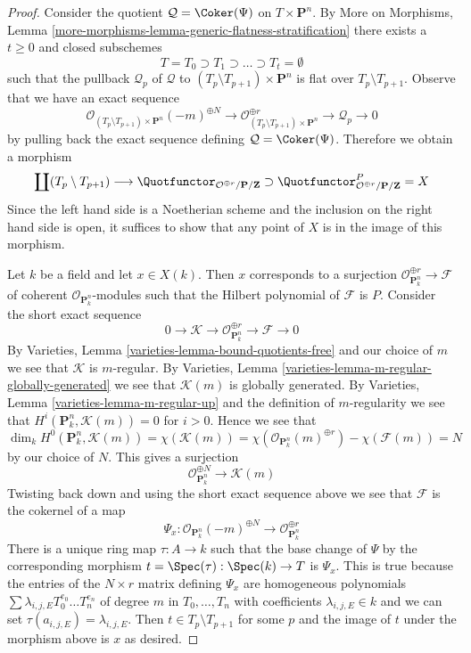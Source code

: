 \begin{proof}
\medskip\noindent
Consider the quotient $\mathcal{Q} = \Coker(\Psi)$ on $T \times \mathbf{P}^n$.
By More on Morphisms, Lemma
\ref{more-morphisms-lemma-generic-flatness-stratification}
there exists a $t \geq 0$ and closed subschemes
$$
T = T_0 \supset T_1 \supset \ldots \supset T_t = \emptyset
$$
such that the pullback $\mathcal{Q}_p$ of $\mathcal{Q}$ to
$(T_p \setminus T_{p + 1}) \times \mathbf{P}^n$ is flat over
$T_p \setminus T_{p + 1}$. Observe that we
have an exact sequence
$$
\mathcal{O}_{(T_p \setminus T_{p + 1}) \times \mathbf{P}^n}(-m)^{\oplus N}
\to
\mathcal{O}_{(T_p \setminus T_{p + 1}) \times \mathbf{P}^n}^{\oplus r}
\to
\mathcal{Q}_p
\to
0
$$
by pulling back the exact sequence defining $\mathcal{Q} = \Coker(\Psi)$.
Therefore we obtain a morphism
$$
\coprod (T_p \setminus T_{p + 1})
\longrightarrow
\Quotfunctor_{\mathcal{O}^{\oplus r}/\mathbf{P}/\mathbf{Z}}
\supset
\Quotfunctor^P_{\mathcal{O}^{\oplus r}/\mathbf{P}/\mathbf{Z}} = X
$$
Since the left hand side is a Noetherian scheme and the inclusion
on the right hand side is open, it
suffices to show that any point of $X$ is in the image of this morphism.

\medskip\noindent
Let $k$ be a field and let $x \in X(k)$. Then $x$ corresponds to
a surjection $\mathcal{O}_{\mathbf{P}^n_k}^{\oplus r} \to \mathcal{F}$
of coherent $\mathcal{O}_{\mathbf{P}^n_k}$-modules
such that the Hilbert polynomial of $\mathcal{F}$ is $P$.
Consider the short exact sequence
$$
0 \to \mathcal{K} \to
\mathcal{O}_{\mathbf{P}^n_k}^{\oplus r} \to
\mathcal{F} \to 0
$$
By Varieties, Lemma \ref{varieties-lemma-bound-quotients-free}
and our choice of $m$ we see that $\mathcal{K}$ is $m$-regular.
By Varieties, Lemma \ref{varieties-lemma-m-regular-globally-generated}
we see that $\mathcal{K}(m)$ is globally generated.
By Varieties, Lemma \ref{varieties-lemma-m-regular-up}
and the definition of $m$-regularity we see that
$H^i(\mathbf{P}^n_k, \mathcal{K}(m)) = 0$ for $i > 0$.
Hence we see that
$$
\dim_k H^0(\mathbf{P}^n_k, \mathcal{K}(m)) =
\chi(\mathcal{K}(m)) =
\chi(\mathcal{O}_{\mathbf{P}^n_k}(m)^{\oplus r}) -
\chi(\mathcal{F}(m)) = N
$$
by our choice of $N$. This gives a surjection
$$
\mathcal{O}_{\mathbf{P}^n_k}^{\oplus N}
\longrightarrow
\mathcal{K}(m)
$$
Twisting back down and using the short exact sequence above
we see that $\mathcal{F}$ is the cokernel of a map
$$
\Psi_x :
\mathcal{O}_{\mathbf{P}^n_k}(-m)^{\oplus N}
\to
\mathcal{O}_{\mathbf{P}^n_k}^{\oplus r}
$$
There is a unique ring map $\tau : A \to k$ such that the base change
of $\Psi$ by the corresponding morphism $t = \Spec(\tau) : \Spec(k) \to T$
is $\Psi_x$. This is true because the entries of the $N \times r$
matrix defining $\Psi_x$ are homogeneous polynomials
$\sum \lambda_{i, j, E} T_0^{e_0} \ldots T_n^{e_n}$
of degree $m$ in $T_0, \ldots, T_n$ with coefficients
$\lambda_{i, j, E} \in k$ and we can set
$\tau(a_{i, j, E}) = \lambda_{i, j, E}$.
Then $t \in T_p \setminus T_{p + 1}$ for some $p$ and
the image of $t$ under the morphism above is $x$ as desired.
\end{proof}
